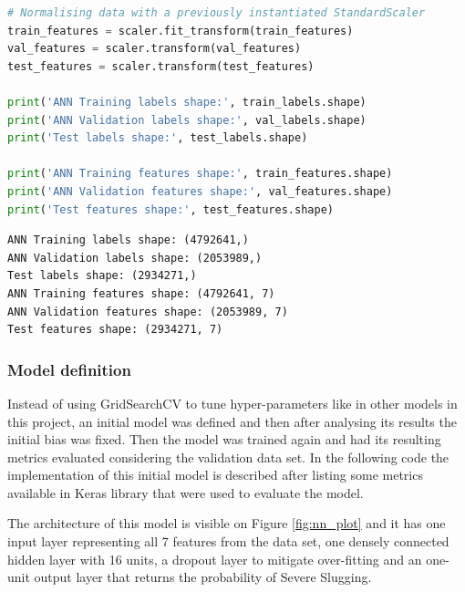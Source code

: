\documentclass{article}
\begin{document}
\begin{lstlisting}[language=Python]
# Normalising data with a previously instantiated StandardScaler
train_features = scaler.fit_transform(train_features)
val_features = scaler.transform(val_features)
test_features = scaler.transform(test_features)

print('ANN Training labels shape:', train_labels.shape)
print('ANN Validation labels shape:', val_labels.shape)
print('Test labels shape:', test_labels.shape)

print('ANN Training features shape:', train_features.shape)
print('ANN Validation features shape:', val_features.shape)
print('Test features shape:', test_features.shape)
\end{lstlisting}
\begin{verbatim}
ANN Training labels shape: (4792641,)
ANN Validation labels shape: (2053989,)
Test labels shape: (2934271,)
ANN Training features shape: (4792641, 7)
ANN Validation features shape: (2053989, 7)
Test features shape: (2934271, 7)
\end{verbatim}

\subsubsection{Model definition}
Instead of using GridSearchCV to tune hyper-parameters like in other models in this project, an initial model was defined and then after analysing its results the initial bias was fixed. Then the model was trained again and had its resulting metrics evaluated considering the validation data set. In the following code the implementation of this initial model is described after listing some metrics available in Keras library that were used to evaluate the model.  

The architecture of this model is visible on Figure \ref{fig:nn_plot} and it has one input layer representing all 7 features from the data set, one densely connected hidden layer with 16 units, a dropout layer to mitigate over-fitting and an one-unit output layer that returns the probability of Severe Slugging.
\end{document}
